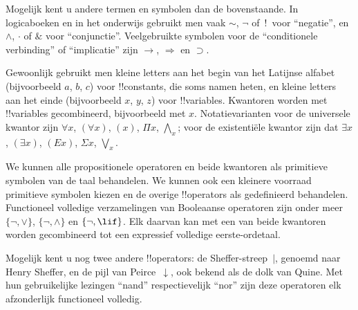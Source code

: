 \documentclass[../../../include/open-logic-section]{subfiles}
\begin{document}

\begin{intro}
Mogelijk kent u andere termen en symbolen dan de bovenstaande. In
logicaboeken en in het onderwijs gebruikt men vaak $\sim$, $\neg$ of~!\ voor
``negatie'', en $\wedge$, $\cdot$ of $\&$ voor ``conjunctie''.
Veelgebruikte symbolen voor de ``conditionele verbinding'' of
``implicatie'' zijn $\rightarrow$, $\Rightarrow$ en $\supset$.

Gewoonlijk gebruikt men kleine letters aan het begin van het Latijnse
alfabet (bijvoorbeeld $a$, $b$, $c$) voor !!{constant}s, die soms namen
heten, en kleine letters aan het einde (bijvoorbeeld $x$, $y$, $z$)
voor !!{variable}s. Kwantoren worden met !!{variable}s gecombineerd,
bijvoorbeeld met $x$. Notatievarianten voor de universele kwantor zijn
$\forall x$, $(\forall x)$, $(x)$, $\Pi x$, $\bigwedge_x$; voor de
existentiële kwantor zijn dat $\exists x$, $(\exists x)$, $(Ex)$,
$\Sigma x$, $\bigvee_x$.
\end{intro}

\begin{explain}
We kunnen alle propositionele operatoren en beide kwantoren als
primitieve symbolen van de taal behandelen. We kunnen ook een kleinere
voorraad primitieve symbolen kiezen en de overige !!{operator}s als
gedefinieerd behandelen. Functioneel volledige verzamelingen van
Booleaanse operatoren zijn onder meer $\{ \lnot, \lor \}$,
$\{ \lnot, \land \}$ en $\{ \lnot, \lif\}$. Elk daarvan kan met een
van beide kwantoren worden gecombineerd tot een expressief volledige
eerste-ordetaal.

Mogelijk kent u nog twee andere !!{operator}s: de Sheffer-streep~$|$,
genoemd naar Henry Sheffer, en de pijl van Peirce~$\downarrow$, ook
bekend als de dolk van Quine. Met hun gebruikelijke lezingen ``nand''
respectievelijk ``nor'' zijn deze operatoren elk afzonderlijk
functioneel volledig.
\end{explain}
\end{document}
